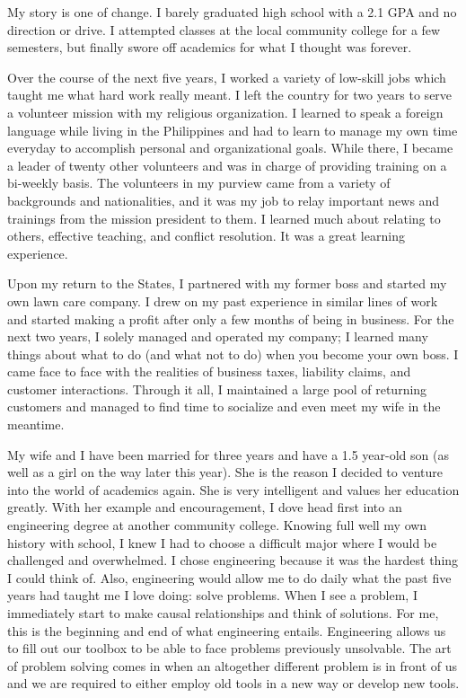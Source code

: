 \documentclass{article}
\begin{document}
My story is one of change. I barely graduated high school with a 2.1 GPA and no direction or drive. I attempted classes at the local community college for a few semesters, but finally swore off academics for what I thought was forever.

Over the course of the next five years, I worked a variety of low-skill jobs which taught me what hard work really meant. I left the country for two years to serve a volunteer mission with my religious organization. I learned to speak a foreign language while living in the Philippines and had to learn to manage my own time everyday to accomplish personal and organizational goals. While there, I became a leader of twenty other volunteers and was in charge of providing training on a bi-weekly basis. The volunteers in my purview came from a variety of backgrounds and nationalities, and it was my job to relay important news and trainings from the mission president to them. I learned much about relating to others, effective teaching, and conflict resolution. It was a great learning experience.

Upon my return to the States, I partnered with my former boss and started my own lawn care company. I drew on my past experience in similar lines of work and started making a profit after only a few months of being in business. For the next two years, I solely managed and operated my company; I learned many things about what to do (and what not to do) when you become your own boss. I came face to face with the realities of business taxes, liability claims, and customer interactions. Through it all, I maintained a large pool of returning customers and managed to find time to socialize and even meet my wife in the meantime.

My wife and I have been married for three years and have a 1.5 year-old son (as well as a girl on the way later this year). She is the reason I decided to venture into the world of academics again. She is very intelligent and values her education greatly. With her example and encouragement, I dove head first into an engineering degree at another community college. Knowing full well my own history with school, I knew I had to choose a difficult major where I would be challenged and overwhelmed. I chose engineering because it was the hardest thing I could think of. Also, engineering would allow me to do daily what the past five years had taught me I love doing: solve problems. When I see a problem, I immediately start to make causal relationships and think of solutions. For me, this is the beginning and end of what engineering entails. Engineering allows us to fill out our toolbox to be able to face problems previously unsolvable. The art of problem solving comes in when an altogether different problem is in front of us and we are required to either employ old tools in a new way or develop new tools. 
\end{document}
